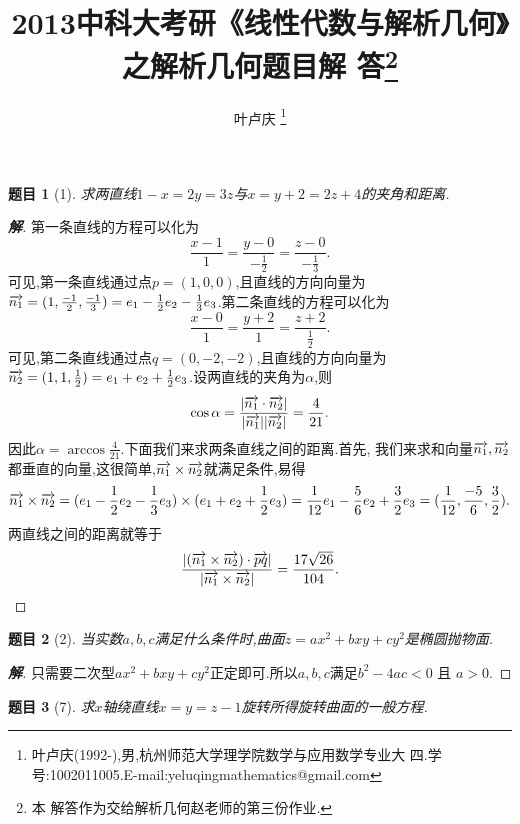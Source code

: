 ﻿\documentclass[a3paper]{article}
\newtheorem*{exe}{题目}
\newenvironment{exercise}
{\bigskip\begin{mdframed}\begin{exe}}
    {\end{exe}\end{mdframed}\bigskip}
\numberwithin{equation}{section}
\begin{document}
\title{\huge{\bf{2013中科大考研《线性代数与解析几何》之解析几何题目解
      答\footnote{本
        解答作为交给解析几何赵老师的第三份作业.}}}} \author{\small{叶卢庆
    \footnote{叶卢庆(1992-),男,杭州师范大学理学院数学与应用数学专业大
      四.学号:1002011005.E-mail:yeluqingmathematics@gmail.com}}}
\maketitle
\begin{exercise}[1]
求两直线$1-x=2y=3z$与$x=y+2=2z+4$的夹角和距离.
\end{exercise}
\begin{proof}[\textbf{解}]
第一条直线的方程可以化为
$$
\frac{x-1}{1}=\frac{y-0}{-\frac{1}{2}}=\frac{z-0}{-\frac{1}{3}}.
$$
可见,第一条直线通过点$p=(1,0,0)$,且直线的方向向量为
$\overrightarrow{n_{1}}=(1,\frac{-1}{2},\frac{-1}{3})=e_{1}-\frac{1}{2}e_{2}-\frac{1}{3}e_{3}$.第二条直线的方程可以化为
$$
\frac{x-0}{1}=\frac{y+2}{1}=\frac{z+2}{\frac{1}{2}}.
$$
可见,第二条直线通过点$q=(0,-2,-2)$,且直线的方向向量为
$\overrightarrow{n_2}=(1,1,\frac{1}{2})=e_1+e_2+\frac{1}{2}e_{3}$.设两直线的夹角为$\alpha$,则
$$
\cos\alpha=\frac{|\overrightarrow{n_1}\cdot \overrightarrow{n_2}|}{|\overrightarrow{n_1}||\overrightarrow{n_2}|}=\frac{4}{21}.
$$
因此$\alpha=\arccos \frac{4}{21}$.下面我们来求两条直线之间的距离.首先,
我们来求和向量$\overrightarrow{n_1},\overrightarrow{n_2}$都垂直的向量,这很简单,$\overrightarrow{n_1}\times
\overrightarrow{n_2}$就满足条件,易得
$$
\overrightarrow{n_1}\times \overrightarrow{n_2}=(e_1-\frac{1}{2}e_2-\frac{1}{3}e_3)\times (e_1+e_2+\frac{1}{2}e_3)=\frac{1}{12}e_1-\frac{5}{6}e_2+\frac{3}{2}e_3=(\frac{1}{12},\frac{-5}{6},\frac{3}{2}).
$$
两直线之间的距离就等于
$$
\frac{|(\overrightarrow{n_1}\times\overrightarrow{n_2})\cdot \overrightarrow{pq}|}{|\overrightarrow{n_1}\times
  \overrightarrow{n_2}|}=\frac{17 \sqrt{26}}{104}.
$$
\end{proof}
\begin{exercise}[2]
当实数$a,b,c$满足什么条件时,曲面$z=ax^2+bxy+cy^2$是椭圆抛物面.  
\end{exercise}
\begin{proof}[\textbf{解}]
只需要二次型$ax^2+bxy+cy^2$正定即可.所以$a,b,c$满足$b^2-4ac<0$ 且 $a>0$.
\end{proof}
\begin{exercise}[7]
求$x$轴绕直线$x=y=z-1$旋转所得旋转曲面的一般方程.  
\end{exercise}
\end{document}
